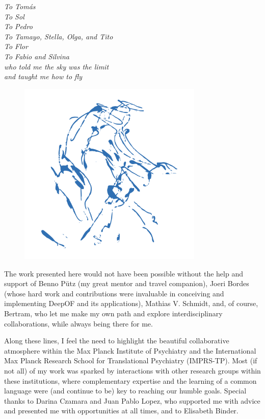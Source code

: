 \hspace{0pt}
\vfill

\begin{center}

\textit{To Tomás}\\
\textit{To Sol}\\
\textit{To Pedro}\\
\textit{To Tamayo, Stella, Olga, and Tito}\\
\textit{To Flor}\\
\textit{To Fabio and Silvina}\\
\textit{who told me the sky was the limit}\\
\textit{and taught me how to fly}\\

\end{center}

\begin{figure}[!thb]
\centering
\includegraphics[width=250pt]{Figures/acknowledgements_1.pdf}
\centering
\vfill
\end{figure}

\vfill
\hspace{0pt}

\newpage

The work presented here would not have been possible without the help and support of Benno Pütz (my great mentor and travel companion), Joeri Bordes (whose hard work and contributions were invaluable in conceiving and implementing DeepOF and its applications), Mathias V. Schmidt, and, of course, Bertram, who let me make my own path and explore interdisciplinary collaborations, while always being there for me.

Along these lines, I feel the need to highlight the beautiful collaborative atmosphere within the Max Planck Institute of Psychiatry and the International Max Planck Research School for Translational Psychiatry (IMPRS-TP). Most (if not all) of my work was sparked by interactions with other research groups within these institutions, where complementary expertise and the learning of a common language were (and continue to be) key to reaching our humble goals. Special thanks to Darina Czamara and Juan Pablo Lopez, who supported me with advice and presented me with opportunities at all times, and to Elisabeth Binder.

